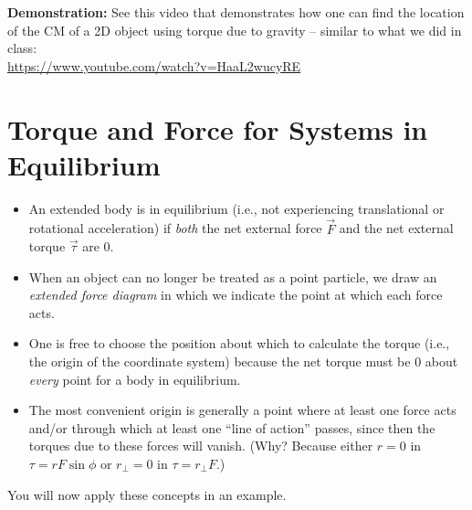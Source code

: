 \documentclass[11pt, letterpaper, openany]{book}
\begin{document}
\textbf{Demonstration:} See this video that demonstrates how one can find the location of the CM of a 2D object using torque due to gravity -- similar to what we did in class: \\
\url{https://www.youtube.com/watch?v=HaaL2wucyRE}

\section*{Torque and Force for Systems in Equilibrium}

\begin{itemize}
    \item An extended body is in equilibrium (i.e., not experiencing translational or rotational acceleration) if \textit{both} the net external force $\vec{F}$ and the net external torque $\vec{\tau}$ are 0.
    \item When an object can no longer be treated as a point particle, we draw an \textit{extended force diagram} in which we indicate the point at which each force acts.
    \item One is free to choose the position about which to calculate the torque (i.e., the origin of the coordinate system) because the net torque must be 0 about \textit{every} point for a body in equilibrium.
    \item The most convenient origin is generally a point where at least one force acts and/or through which at least one ``line of action'' passes, since then the torques due to these forces will vanish. (Why? Because either $r=0$ in $\tau = rF\sin\phi$ or $r_\perp = 0$ in $\tau = r_\perp F$.)
\end{itemize}

You will now apply these concepts in an example.
\end{document}
